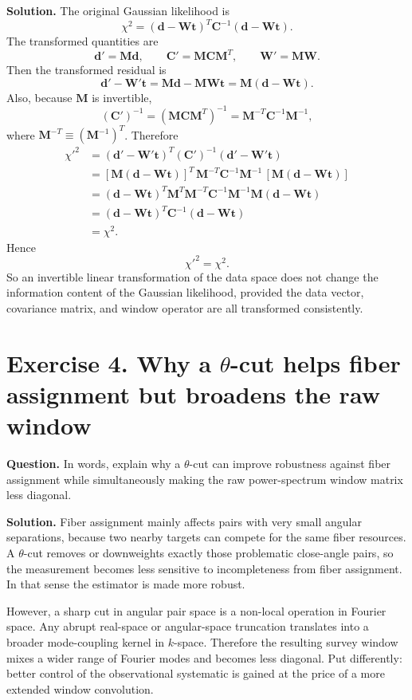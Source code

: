 \documentclass[11pt]{article}
\newcommand{\C}{\mathbf C}
\newcommand{\W}{\mathbf W}
\newcommand{\M}{\mathbf M}
\newcommand{\tvec}{\mathbf t}
\newcommand{\dvec}{\mathbf d}
\begin{document}
\bigskip
\textbf{Solution.}
The original Gaussian likelihood is
\[
\chi^2=(\dvec-\W\tvec)^T\C^{-1}(\dvec-\W\tvec).
\]
The transformed quantities are
\[
\dvec'=\M\dvec,
\qquad
\C'=\M\C\M^T,
\qquad
\W'=\M\W.
\]
Then the transformed residual is
\[
\dvec'-\W'\tvec = \M\dvec-\M\W\tvec = \M(\dvec-\W\tvec).
\]
Also, because $\M$ is invertible,
\[
(\C')^{-1}=(\M\C\M^T)^{-1}=\M^{-T}\C^{-1}\M^{-1},
\]
where $\M^{-T}\equiv (\M^{-1})^T$. Therefore
\begin{align*}
\chi'^2
&=(\dvec'-\W'\tvec)^T(\C')^{-1}(\dvec'-\W'\tvec)\\
&=[\M(\dvec-\W\tvec)]^T\,\M^{-T}\C^{-1}\M^{-1}\,[\M(\dvec-\W\tvec)]\\
&=(\dvec-\W\tvec)^T\M^T\M^{-T}\C^{-1}\M^{-1}\M(\dvec-\W\tvec)\\
&=(\dvec-\W\tvec)^T\C^{-1}(\dvec-\W\tvec)\\
&=\chi^2.
\end{align*}
Hence
\[
\boxed{\chi'^2=\chi^2.}
\]
So an invertible linear transformation of the data space does not change the information content of the Gaussian likelihood, provided the data vector, covariance matrix, and window operator are all transformed consistently.

\section*{Exercise 4. Why a $\theta$-cut helps fiber assignment but broadens the raw window}
\textbf{Question.} In words, explain why a $\theta$-cut can improve robustness against fiber assignment while simultaneously making the raw power-spectrum window matrix less diagonal.

\bigskip
\textbf{Solution.}
Fiber assignment mainly affects pairs with very small angular separations, because two nearby targets can compete for the same fiber resources. A $\theta$-cut removes or downweights exactly those problematic close-angle pairs, so the measurement becomes less sensitive to incompleteness from fiber assignment. In that sense the estimator is made more robust.

However, a sharp cut in angular pair space is a non-local operation in Fourier space. Any abrupt real-space or angular-space truncation translates into a broader mode-coupling kernel in $k$-space. Therefore the resulting survey window mixes a wider range of Fourier modes and becomes less diagonal. Put differently: better control of the observational systematic is gained at the price of a more extended window convolution.
\end{document}
